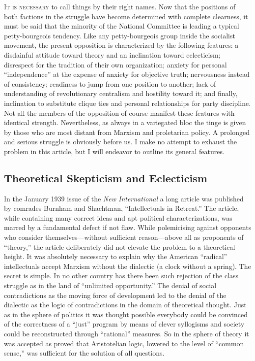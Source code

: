 
\noindent
\textsc{It is necessary} to call things by their right names. Now that the positions of both factions in the struggle have become determined with complete clearness, it must be said that the minority of the National Committee is leading a typical petty-bourgeois tendency. Like any petty-bourgeois group inside the socialist movement, the present opposition is characterized by the following features: a disdainful attitude toward theory and an inclination toward eclecticism; disrespect for the tradition of their own organization; anxiety for personal “independence” at the expense of anxiety for objective truth; nervousness instead of consistency; readiness to jump from one position to another; lack of understanding of revolutionary centralism and hostility toward it; and finally, inclination to substitute clique ties and personal relationships for party discipline. Not all the members of the opposition of course manifest these features with identical strength. Nevertheless, as always in a variegated bloc the tinge is given by those who are most distant from Marxism and proletarian policy. A prolonged and serious struggle is obviously before us. I make no attempt to exhaust the problem in this article, but I will endeavor to outline its general features.

\subsection*{Theoretical Skepticism and Eclecticism}

In the January 1939 issue of the \emph{New International} a long article was published by comrades Burnham and Shachtman, ``Intellectuals in Retreat.'' The article, while containing many correct ideas and apt political characterizations, was marred by a fundamental defect if not flaw. While polemicising against opponents who consider themselves---without sufficient reason---above all as proponents of “theory,” the article deliberately did not elevate the problem to a theoretical height. It was absolutely necessary to explain why the American “radical” intellectuals accept Marxism without the dialectic (a clock without a spring). The secret is simple. In no other country has there been such rejection of the class struggle as in the land of “unlimited opportunity.” The denial of social contradictions as the moving force of development led to the denial of the dialectic as the logic of contradictions in the domain of theoretical thought. Just as in the sphere of politics it was thought possible everybody could be convinced of the correctness of a “just” program by means of clever syllogisms and society could be reconstructed through “rational” measures. So in the sphere of theory it was accepted as proved that Aristotelian logic, lowered to the level of ``common sense,'' was sufficient for the solution of all questions.

